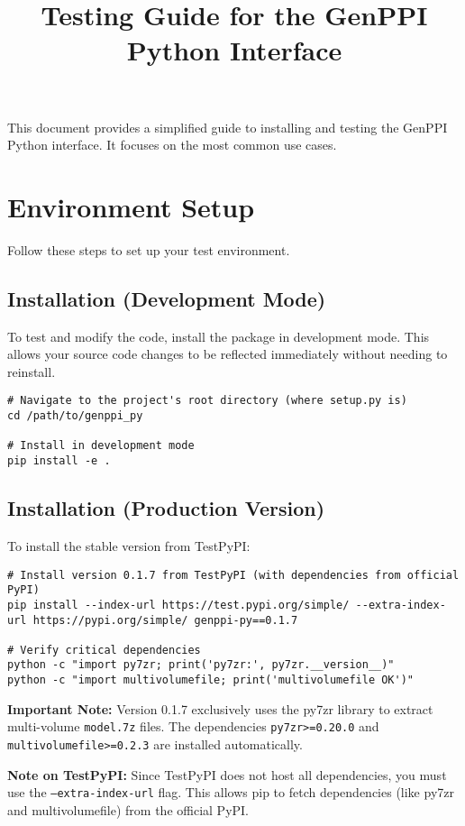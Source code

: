 \documentclass[11pt, a4paper]{article}
\title{\bfseries Testing Guide for the GenPPI Python Interface}
\author{}
\date{}
\begin{document}
\maketitle

This document provides a simplified guide to installing and testing the GenPPI Python interface. It focuses on the most common use cases.

\section{Environment Setup}
Follow these steps to set up your test environment.

\subsection{Installation (Development Mode)}
To test and modify the code, install the package in development mode. This allows your source code changes to be reflected immediately without needing to reinstall.

\begin{lstlisting}[style=bashstyle]
# Navigate to the project's root directory (where setup.py is)
cd /path/to/genppi_py

# Install in development mode
pip install -e .
\end{lstlisting}

\subsection{Installation (Production Version)}
To install the stable version from TestPyPI:

\begin{lstlisting}[style=bashstyle]
# Install version 0.1.7 from TestPyPI (with dependencies from official PyPI)
pip install --index-url https://test.pypi.org/simple/ --extra-index-url https://pypi.org/simple/ genppi-py==0.1.7

# Verify critical dependencies
python -c "import py7zr; print('py7zr:', py7zr.__version__)"
python -c "import multivolumefile; print('multivolumefile OK')"
\end{lstlisting}

\textbf{Important Note:} Version 0.1.7 exclusively uses the py7zr library to extract multi-volume \texttt{model.7z} files. The dependencies \texttt{py7zr>=0.20.0} and \texttt{multivolumefile>=0.2.3} are installed automatically.

\textbf{Note on TestPyPI:} Since TestPyPI does not host all dependencies, you must use the \texttt{--extra-index-url} flag. This allows pip to fetch dependencies (like py7zr and multivolumefile) from the official PyPI.
\end{document}

